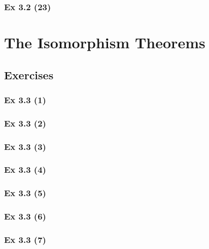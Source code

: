 \subsubsection{Ex 3.2 (23)}\label{sec:Ex_3.2.23}

\newpage		%

\section{The Isomorphism Theorems}\label{sec:3.3}	
\subsection*{Exercises}\label{sec:3.3_Exercises}

\subsubsection{Ex 3.3 (1)}\label{sec:Ex_3.3.1}

\subsubsection{Ex 3.3 (2)}\label{sec:Ex_3.3.2}

\subsubsection{Ex 3.3 (3)}\label{sec:Ex_3.3.3}

\subsubsection{Ex 3.3 (4)}\label{sec:Ex_3.3.4}

\subsubsection{Ex 3.3 (5)}\label{sec:Ex_3.3.5}

\subsubsection{Ex 3.3 (6)}\label{sec:Ex_3.3.6}

\subsubsection{Ex 3.3 (7)}\label{sec:Ex_3.3.7}

